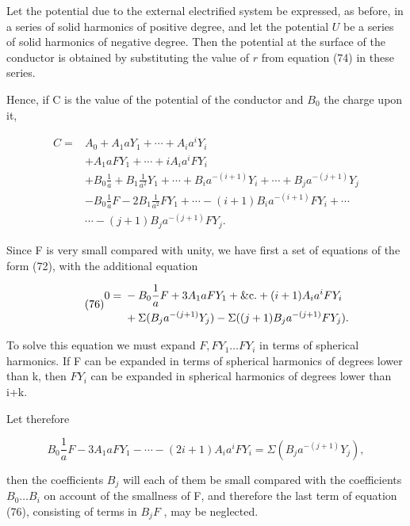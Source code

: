\documentclass[11pt,a4paper]{article}
\begin{document}
Let the potential due to the external electrified system be expressed, as before, in a series of solid harmonics of positive degree, and let the potential $U$ be a series of solid harmonics of negative degree. Then the potential at the surface of the conductor is obtained by substituting the value of $r$ from equation (74) in these series.

Hence, if C is the value of the potential of the conductor and  $B_0$  the charge upon it,

\begin{equation}\tag{75}
\begin{split}
C={}&A_0+A_1aY_1+\cdots+A_ia^iY_i\\
&+A_1aFY_1+\cdots+iA_ia^iFY_i\\
&+B_0\frac{1}{a}+B_1\frac{1}{a^2}Y_1+\cdots+B_ia^{-(i+1)}Y_i+\cdots+B_ja^{-(j+1)}Y_j\\
&-B_0\frac{1}{a}F-2B_1\frac{1}{a^2}FY_1+\cdots-(i+1)B_ia^{-(i+1)}FY_i+\cdots\\
&\cdots-(j+1)B_ja^{-(j+1)}FY_j.
\end{split}
\end{equation}

Since F is very small compared with unity, we have first a set of equations of the form (72), with the additional equation

\begin{equation}\tag{76}
\begin{split}
0={}&-B_0\frac{1}{a}F+3A_1aFY_1+\hbox{\&c.}+(i+1)A_ia^iFY_i\\
&+\Sigma(B_ja^{-(j+1)}Y_j)-\Sigma((j+1)B_ja^{-(j+1)}FY_j).
\end{split}
\end{equation}

To solve this equation we must expand  $F, FY_1 \dots FY_i$  in terms of spherical harmonics. If F can be expanded in terms of spherical harmonics of degrees lower than k, then  $FY_i$  can be expanded in spherical harmonics of degrees lower than i+k.

Let therefore

\begin{equation}\tag{77}
B_0\frac{1}{a}F-3A_1aFY_1-\cdots-(2i+1)A_ia^iFY_i=\Sigma(B_ja^{-(j+1)}Y_j),
\end{equation}

then the coefficients  $B_j$  will each of them be small compared with the coefficients  $B_0 \dots B_i$  on account of the smallness of F, and therefore the last term of equation (76), consisting of terms in  $B_j F$ , may be neglected.
\end{document}
